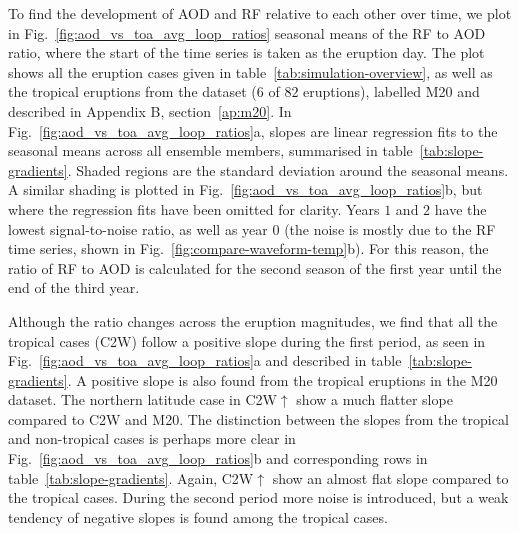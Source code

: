 \documentclass[draft]{agujournal2019}
\newcommand{\cwsn}{C2W\(\uparrow\)}
\begin{document}
To find the development of AOD and RF relative to each other over time, we
plot in Fig.~\ref{fig:aod_vs_toa_avg_loop_ratios} seasonal means of the RF to
AOD ratio, where the start of the time series is taken as the eruption day. The
plot shows all the eruption cases given in table~\ref{tab:simulation-overview}, as well
as the tropical eruptions from the  dataset (\(6\) of \(82\)
eruptions), labelled M20 and described in Appendix B, section~\ref{ap:m20}. In
Fig.~\ref{fig:aod_vs_toa_avg_loop_ratios}a, slopes are linear regression fits to the
seasonal means across all ensemble members, summarised in
table~\ref{tab:slope-gradients}. Shaded regions are the standard deviation around the
seasonal means. A similar shading is plotted in
Fig.~\ref{fig:aod_vs_toa_avg_loop_ratios}b, but where the regression fits have been
omitted for clarity. Years \(1\) and \(2\) have the lowest signal-to-noise ratio, as
well as year \(0\) (the noise is mostly due to the RF time series, shown in
Fig.~\ref{fig:compare-waveform-temp}b). For this reason, the ratio of RF to
AOD is calculated for the second season of the first year until the end of the
third year.

Although the ratio changes across the eruption magnitudes, we find that all the tropical
cases (C2W) follow a positive slope during the first period, as seen in
Fig.~\ref{fig:aod_vs_toa_avg_loop_ratios}a and described in
table~\ref{tab:slope-gradients}. A positive slope is also found from the tropical
eruptions in the M20 dataset. The northern latitude case in \cwsn{} show a
much flatter slope compared to C2W and M20. The distinction between the
slopes from the tropical and non-tropical cases is perhaps more clear in
Fig.~\ref{fig:aod_vs_toa_avg_loop_ratios}b and corresponding rows in
table~\ref{tab:slope-gradients}. Again, \cwsn{} show an almost flat slope compared
to the tropical cases. During the second period more noise is introduced, but a weak
tendency of negative slopes is found among the tropical cases.
\end{document}
